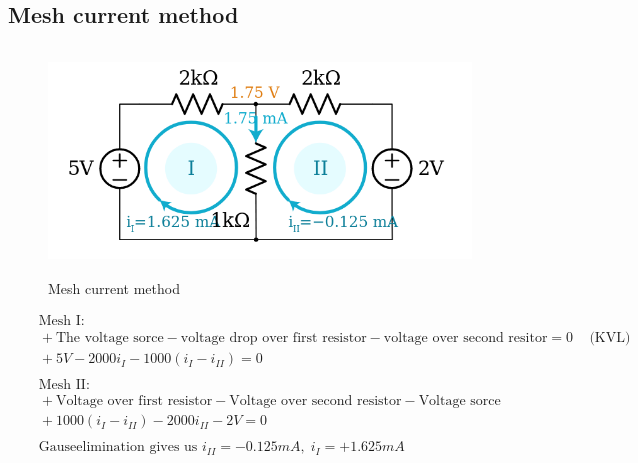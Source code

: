 \documentclass{article}
\begin{document}
\newpage
\subsection{Mesh current method}

\begin{figure}[h]
    \vspace{10mm}
    \centering
    \includegraphics[width=12cm, height=6cm]{image/mesh_current_method.png}
    \caption{Mesh current method}
\end{figure}

\begin{align*}
  &\quad  \text{Mesh I: } \\
  &\quad  +\text{The voltage sorce} -\text{voltage drop over first resistor} 
  -\text{voltage over second resitor} = 0 \;\;\; \text{ (KVL)} \\
  &\quad  +5V -2000i_I -1000(i_I-i_{II}) = 0 \\
  &\quad  \\
  &\quad  \text{Mesh II: } \\
  &\quad  +\text{Voltage over first resistor} -\text{Voltage over second resistor} 
  -\text{Voltage sorce} \\
  &\quad  +1000(i_I-i_{II}) -2000i_{II} -2V = 0 \\
  &\quad  \\
  &\quad  \text{Gauseelimination gives us } i_{II} = -0.125mA, \; i_I = +1.625mA \\
\end{align*}
\end{document}
